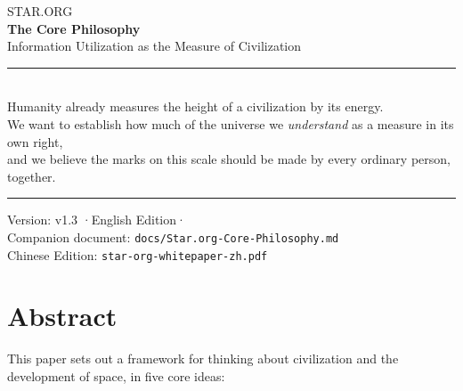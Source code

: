 \documentclass[11pt,fontset=none]{ctexart}
\newcommand{\WHLANG}{English Edition}
\begin{document}
\begin{titlepage}
\centering
\vspace*{28mm}

{\sffamily\footnotesize\color{gold}STAR.ORG}\\[6mm]

{\sffamily\Huge\bfseries\color{accent} The Core Philosophy}\\[5mm]

{\sffamily\large\color{inksoft} Information Utilization as the Measure of Civilization}\\[16mm]

\textcolor{line}{\rule{\linewidth}{0.6pt}}\\[8mm]

{\normalsize\color{inksoft}
Humanity already measures the height of a civilization by its energy.\\
We want to establish how much of the universe we \emph{understand} as a measure in its own right,\\
and we believe the marks on this scale should be made by every ordinary person, together.}\\[8mm]

\textcolor{line}{\rule{\linewidth}{0.6pt}}

\vfill

{\small\color{inkfaint}
Version: v1.3 \quad·\quad \WHLANG \quad·\quad \WHdateEN\\[2mm]
Companion document: \texttt{docs/Star.org-Core-Philosophy.md}\\[1mm]
Chinese Edition: \texttt{star-org-whitepaper-zh.pdf}}

\vspace*{16mm}
\end{titlepage}

\tableofcontents
\newpage

\section*{Abstract}

This paper sets out a framework for thinking about civilization and the development of space, in five core ideas:
\end{document}
